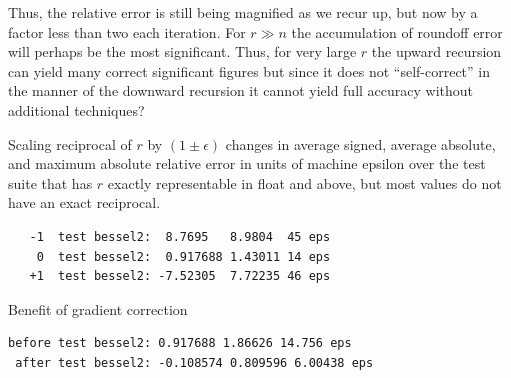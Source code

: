 \documentclass[12pt]{article}
\begin{document}
Thus, the relative error is still being magnified as we recur up, but now by a factor less than two each iteration.  For $r \gg n$ the accumulation of roundoff error will perhaps be the most significant.  Thus, for very large $r$ the upward recursion can yield many correct significant figures but since it does not ``self-correct'' in the manner of the downward recursion it cannot yield full accuracy without additional techniques?

Scaling reciprocal of $r$ by $(1\pm\epsilon)$ changes in average signed, average absolute, and maximum absolute relative error in units of machine epsilon over the test suite that has $r$ exactly representable in float and above, but most values do not have an exact reciprocal.
\begin{verbatim}
   -1  test bessel2:  8.7695   8.9804  45 eps
    0  test bessel2:  0.917688 1.43011 14 eps 
   +1  test bessel2: -7.52305  7.72235 46 eps
\end{verbatim}

Benefit of gradient correction
\begin{verbatim}
before test bessel2: 0.917688 1.86626 14.756 eps 
 after test bessel2: -0.108574 0.809596 6.00438 eps
\end{verbatim}
\end{document}
